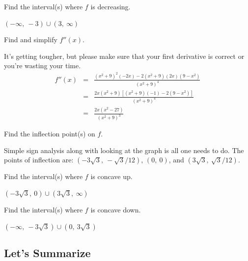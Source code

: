 \documentclass[12pt,addpoints, answers, fleqn]{exam}
\begin{document}
\begin{questions}
\question Find the interval(s) where $f$ is decreasing.

\begin{solution}
$\left(-\infty, \ -3 \right) \cup \left( 3, \ \infty \right)$
\end{solution}

\question Find and simplify $f''\left( x \right)$.

\begin{solution}
It's getting tougher, but please make sure that your first derivative is correct or you're wasting your time.
\begin{eqnarray*}
f'' \left( x \right) &=& \frac{\left(x^2+9\right)^2\left(-2x\right) - 2\left(x^2+9\right)\left(2x\right)\left(9 - x^2\right)}{\left(x^2+9\right)^4}\\
&=&\frac{2x\left(x^2+9\right) \left[  \left(x^2+9\right)\left(-1\right) - 2\left(9 - x^2\right) \right]}{\left(x^2+9\right)^4}\\
&=&\frac{2x \left(  x^2-27 \right)}{\left(x^2+9\right)^3}
\end{eqnarray*}
\end{solution}

\question Find the inflection point(s) on $f$.

\begin{solution}
Simple sign analysis along with looking at the graph is all one needs to do. The points of inflection are: $\left( -3\sqrt{3}, \ -\sqrt{3}/12\right)$, $\left( 0, \ 0\right)$, and $\left( 3\sqrt{3}, \ \sqrt{3}/12\right)$.
\end{solution}

\question Find the interval(s) where $f$ is concave up.

\begin{solution}
$\left(-3\sqrt{3} , \ 0\right) \cup \left(3\sqrt{3} , \ \infty\right)$
\end{solution}

\question Find the interval(s) where $f$ is concave down.

\begin{solution}
$\left(-\infty , \ -3\sqrt{3} \right) \cup \left(0 , \ 3\sqrt{3} \right)$
\end{solution}

\end{questions}


\subsection{Let's Summarize}
\end{document}
